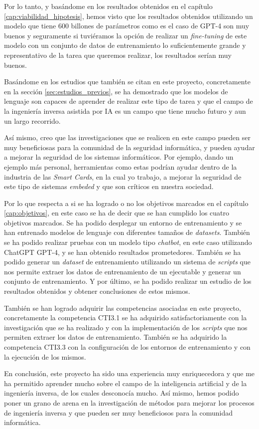 Por lo tanto, y basándome en los resultados obtenidos en el capítulo \ref{cap:viabilidad_hipotesis},
hemos visto que los resultados obtenidos utilizando un modelo que tiene 600 billones de parámetros
como es el caso de GPT-4 son muy buenos y seguramente si tuviéramos la opción de realizar un
\textit{fine-tuning} de este modelo con un conjunto de datos de entrenamiento lo suficientemente
grande y representativo de la tarea que queremos realizar, los resultados serían muy buenos.

Basándome en los estudios que también se citan en este proyecto, concretamente en la sección
\ref{sec:estudios_previos}, se ha demostrado que los modelos de lenguaje son capaces de aprender
de realizar este tipo de tarea y que el campo de la ingeniería inversa asistida por IA es un campo
que tiene mucho futuro y aun un largo recorrido.

Así mismo, creo que las investigaciones que se realicen en este campo pueden ser muy beneficiosas
para la comunidad de la seguridad informática, y pueden ayudar a mejorar la seguridad de los sistemas
informáticos. Por ejemplo, dando un ejemplo más personal, herramientas como estas podrían ayudar dentro
de la industria de las \textit{Smart Cards}, en la cual yo trabajo, a mejorar la seguridad de este tipo
de sistemas \textit{embeded} y que son críticos en nuestra sociedad.

Por lo que respecta a si se ha logrado o no los objetivos marcados en el capítulo \ref{cap:objetivos},
en este caso se ha de decir que se han cumplido los cuatro objetivos marcados. Se ha podido desplegar
un entorno de entrenamiento y se han entrenado modelos de lenguaje con diferentes tamaños de \textit{datasets}.
También se ha podido realizar pruebas con un modelo tipo \textit{chatbot}, en este caso utilizando ChatGPT
GPT-4, y se han obtenido resultados prometedores. También se ha podido generar un \textit{dataset} de entrenamiento
utilizando un sistema de \textit{scripts} que nos permite extraer los datos de entrenamiento de un ejecutable
y generar un conjunto de entrenamiento. Y por último, se ha podido realizar un estudio de los resultados obtenidos
y obtener conclusiones de estos mismos.

También se han logrado adquirir las competencias asociadas en este proyecto, concretamente la
competencia CTI3.1 se ha adquirido satisfactoriamente con la investigación que se ha realizado
y con la implementación de los \textit{scripts} que nos permiten extraer los datos de entrenamiento.
También se ha adquirido la competencia CTI3.3 con la configuración de los entornos de entrenamiento
y con la ejecución de los mismos.

En conclusión, este proyecto ha sido una experiencia muy enriquecedora y que me ha permitido
aprender mucho sobre el campo de la inteligencia artificial y de la ingeniería inversa, de
los cuales desconocía mucho. Así mismo, hemos podido poner un grano de arena en la investigación
de métodos para mejorar los procesos de ingeniería inversa y que pueden ser muy beneficiosos
para la comunidad informática.

